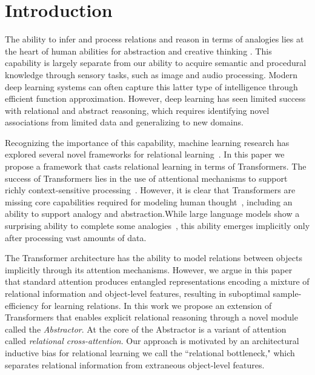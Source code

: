 \section{Introduction}

The ability to infer and process relations and reason in terms of analogies lies at the heart of human abilities for abstraction and creative thinking
\citep{snow,holyoak}. This capability is largely separate from our ability to acquire semantic and procedural knowledge through sensory tasks, such as image and audio processing. Modern deep learning systems can often capture this latter type of intelligence through efficient function approximation. However, deep learning has seen limited success with relational and abstract reasoning, which requires identifying novel associations from limited data and generalizing to new domains.

Recognizing the importance of this capability, machine learning research has explored several novel frameworks for relational learning~\citep{TEM, NTM,episodicControl,shanahanExplicitlyRelationalNeural,esbn,mondal23learned,battaglia,barrett:2018,santoro1}. In this paper we propose a framework that casts relational learning in terms of Transformers. The success of Transformers lies in the use of attentional mechanisms to support richly context-sensitive processing~\citep{transformers,vaswani2017attention,kerg2020untangling}. However, it is clear that Transformers are missing core capabilities required for modeling human thought~\citep{mahowald2023dissociating}, including an ability to support analogy and abstraction.While large language models show a surprising ability to complete some analogies~\citep{webb}, this ability emerges implicitly only after processing vast amounts of data.

The Transformer architecture has the ability to model relations between objects implicitly through its attention mechanisms. However, we argue in this paper that standard attention produces entangled representations encoding a mixture of relational information and object-level features, resulting in suboptimal sample-efficiency for learning relations.
In this work we propose an extension of Transformers that enables explicit relational reasoning through a novel module called the \textit{Abstractor}. At the core of the Abstractor is a variant of attention called \textit{relational cross-attention}. Our approach is motivated by an architectural inductive bias for relational learning we call the ``relational bottleneck," which separates relational information from extraneous object-level features.

